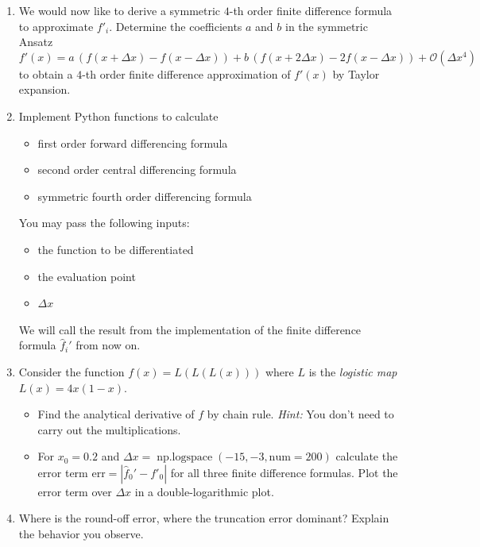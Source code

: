     \begin{enumerate}
        \item We would now like to derive a symmetric $4$-th order finite difference formula
        to approximate $f'_i$. Determine the coefficients $a$ and $b$ in the symmetric Ansatz
        \begin{equation}
            f'(x) = a \, (f(x + \Delta x) - f(x - \Delta x)) + b \, (f(x + 2 \Delta x) - 2 f(x - \Delta x)) + \mathcal{O}(\Delta x^4)
        \end{equation}
        to obtain a $4$-th order finite difference approximation of $f'(x)$ by Taylor expansion.
        \item Implement Python functions to calculate
        \begin{itemize}
            \item first order forward differencing formula
            \item second order central differencing formula
            \item symmetric fourth order differencing formula
        \end{itemize}
        You may pass the following inputs:
        \begin{itemize}
            \item the function to be differentiated
            \item the evaluation point
            \item $\Delta x$
        \end{itemize}
        We will call the result from the implementation of the finite difference formula $\hat{f}_i'$ from now on.
        \item Consider the function $f(x) = L(L(L(x)))$ where $L$ is the \textit{logistic map} $L(x) = 4x(1-x)$.
        \begin{itemize}
            \item Find the analytical derivative of $f$ by chain rule. \textit{Hint:} You don't need to carry out the multiplications.
            \item For $x_0 = 0.2$ and $\Delta x = \operatorname{np.logspace}(-15, -3, \text{num} = 200)$ calculate the error term $\text{err} = |\hat{f}_0' - f'_0|$ 
            for all three finite difference formulas. Plot the error term over $\Delta x$ in a double-logarithmic plot.
        \end{itemize}
        \item Where is the round-off error, where the truncation error dominant? Explain the behavior you observe.
    \end{enumerate}


\pagebreak